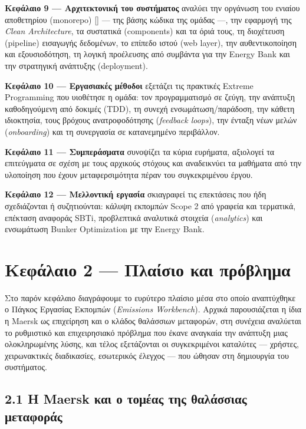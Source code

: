 \documentclass[11pt,a4paper,greek,twoside]{template-xe}
\let\origtexttt\texttt
\renewcommand{\texttt}[1]{%
  \begingroup
  \StrSubstitute{#1}{.}{.\allowbreak}[\tttmp]%
  \origtexttt{\tttmp}%
  \endgroup
}
\begin{document}
\textbf{Κεφάλαιο 9 --- Αρχιτεκτονική του συστήματος} αναλύει την
οργάνωση του ενιαίου αποθετηρίου (monorepo) \texttt{:nrg} --- της βάσης
κώδικα της ομάδας ---, την εφαρμογή της \emph{Clean Architecture}, τα
συστατικά (components) και τα όριά τους, τη διοχέτευση (pipeline)
εισαγωγής δεδομένων, το επίπεδο ιστού (web layer), την αυθεντικοποίηση
και εξουσιοδότηση, τη λογική προέλευσης από συμβάντα για την Energy Bank
και την στρατηγική ανάπτυξης (deployment).

\textbf{Κεφάλαιο 10 --- Εργασιακές μέθοδοι} εξετάζει τις πρακτικές
Extreme Programming που υιοθέτησε η ομάδα: τον προγραμματισμό σε ζεύγη,
την ανάπτυξη καθοδηγούμενη από δοκιμές (TDD), τη συνεχή
ενσωμάτωση/παράδοση, την κάθετη ιδιοκτησία, τους βρόχους ανατροφοδότησης
(\emph{feedback loops}), την ένταξη νέων μελών (\emph{onboarding}) και
τη συνεργασία σε κατανεμημένο περιβάλλον.

\textbf{Κεφάλαιο 11 --- Συμπεράσματα} συνοψίζει τα κύρια ευρήματα,
αξιολογεί τα επιτεύγματα σε σχέση με τους αρχικούς στόχους και
αναδεικνύει τα μαθήματα από την υλοποίηση που έχουν μεταφερσιμότητα
πέραν του συγκεκριμένου έργου.

\textbf{Κεφάλαιο 12 --- Μελλοντική εργασία} σκιαγραφεί τις επεκτάσεις
που ήδη σχεδιάζονται ή συζητιούνται: κάλυψη εκπομπών Scope 2 από γραφεία
και τερματικά, επέκταση αναφοράς SBTi, προβλεπτικά αναλυτικά στοιχεία
(\emph{analytics}) και ενσωμάτωση Bunker Optimization με την Energy
Bank.

\pagebreak

\chapter{Κεφάλαιο 2 --- Πλαίσιο και
πρόβλημα}\label{ux3baux3b5ux3c6ux3acux3bbux3b1ux3b9ux3bf-2-ux3c0ux3bbux3b1ux3afux3c3ux3b9ux3bf-ux3baux3b1ux3b9-ux3c0ux3c1ux3ccux3b2ux3bbux3b7ux3bcux3b1}

Στο παρόν κεφάλαιο διαγράφουμε το ευρύτερο πλαίσιο μέσα στο οποίο
αναπτύχθηκε ο Πάγκος Εργασίας Εκπομπών (\emph{Emissions Workbench}).
Αρχικά παρουσιάζεται η ίδια η Maersk ως επιχείρηση και ο κλάδος
θαλάσσιων μεταφορών, στη συνέχεια αναλύεται το ρυθμιστικό και
επιχειρησιακό πρόβλημα που έκανε αναγκαία την ανάπτυξη μιας
ολοκληρωμένης λύσης, και τέλος εξετάζονται οι συγκεκριμένοι καταλύτες
--- χρήστες, χειρωνακτικές διαδικασίες, εσωτερικός έλεγχος --- που
ώθησαν στη δημιουργία του συστήματος.

\section{2.1 Η Maersk και ο τομέας της θαλάσσιας
μεταφοράς}\label{ux3b7-maersk-ux3baux3b1ux3b9-ux3bf-ux3c4ux3bfux3bcux3adux3b1ux3c2-ux3c4ux3b7ux3c2-ux3b8ux3b1ux3bbux3acux3c3ux3c3ux3b9ux3b1ux3c2-ux3bcux3b5ux3c4ux3b1ux3c6ux3bfux3c1ux3acux3c2}
\end{document}
